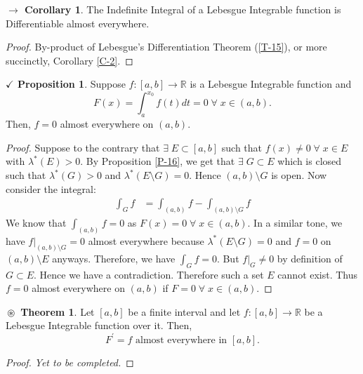 \documentclass{article}
\theoremstyle{definition}
\newtheorem{theorem}{$\boxed{\boxed{\circledast}}$ Theorem}
\theoremstyle{remark}
\theoremstyle{definition}
\newtheorem{corollary}{$ \to $ Corollary}
\theoremstyle{definition}
\newtheorem{proposition}{$\checkmark$ Proposition}
\theoremstyle{definition}
\newcommand{\R}{\mathbb{R}}
\newcommand{\lom}[1]{\lambda^*\left (#1\right )}
\begin{document}
\begin{corollary}
	The Indefinite Integral of a Lebesgue Integrable function is Differentiable almost everywhere.
\end{corollary}
\begin{proof}
	By-product of Lebesgue's Differentiation Theorem (\ref{T-15}), or more succinctly, Corollary \ref{C-2}. 
\end{proof}
\hrulefill
\newpage
\begin{proposition}
Suppose $ f : [a,b]  \longrightarrow \R$ is a Lebesgue Integrable function and 
\[F(x) = \int_{a}^{x_0} f(t)dt = 0 \;\forall\;x\in (a,b).\]
Then, $ f = 0 $ almost everywhere on $ (a,b) $.
\end{proposition}
\begin{proof}
		Suppose to the contrary that $ \exists\; E \subset [a,b] $ such that $ f(x) \neq 0 \;\forall\;x\in E $ with $ \lom{E} > 0 $. By Proposition \ref{P-16}, we get that $ \exists\;G\subset E $ which is closed such that $ \lom{G} > 0 $ and $ \lom{E\setminus G} = 0 $. Hence $ (a,b)\setminus G $ is open. Now consider the integral:
		\begin{align*}
			\int_{G} f &= \int_{(a,b)} f - \int_{(a,b)\setminus G} f
		\end{align*}
	We know that $ \int_{(a,b)} f = 0 $ as $ F(x) = 0\;\forall \;x\in(a,b) $. In a similar tone, we have $ \left. f\right \vert_{(a,b)\setminus G} = 0 $ almost everywhere because $ \lom{E\setminus G} = 0 $ and $ f = 0$ on $ (a,b) \setminus E $ anyways. Therefore, we have $ \int_G  f = 0$. But $ \left .f\right \vert_{G} \neq 0 $ by definition of $ G \subset E $. Hence we have a contradiction. Therefore such a set $ E $ cannot exist. Thus $ f = 0 $ almost everywhere on $ (a,b) $ if $ F = 0 \;\forall \;x\in (a,b) $.
\end{proof}
\hrulefill
\begin{theorem}
	Let $ [a,b] $ be a finite interval and let $ f : [a,b] \longrightarrow \R $ be a Lebesgue Integrable function over it. Then,
	\[F^{\prime} = f\text{ almost everywhere in }[a,b].\]
\end{theorem}
\begin{proof}
	\emph{Yet to be completed.}
\end{proof}
\hrulefill
\end{document}
